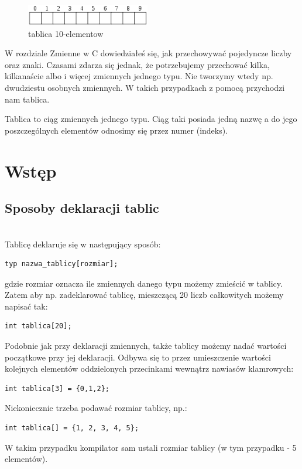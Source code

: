 \documentclass[a4paper,12pt]{article}
\begin{document}
\begin{figure}
\begin{center}
\includegraphics[width=0.48\textwidth]{pic1.png}
\end{center}
\caption{tablica 10-elementow}
\label{Etykieta}
\end{figure}

W rozdziale Zmienne w C dowiedziałeś się, jak przechowywać pojedyncze liczby oraz znaki. Czasami zdarza się jednak, że potrzebujemy przechować kilka, kilkanaście albo i więcej zmiennych jednego typu. Nie tworzymy wtedy np. dwudziestu osobnych zmiennych. W takich przypadkach z pomocą przychodzi nam tablica.



Tablica to ciąg zmiennych jednego typu. Ciąg taki posiada jedną nazwę a do jego poszczególnych elementów odnosimy się przez numer (indeks).

\section*{Wstęp}

\subsection*{Sposoby deklaracji tablic}\\

Tablicę deklaruje się w następujący sposób:
\begin{lstlisting}[caption=Deklaracja, captionpos=t, label=src:sqrt, frame=lBTr, frameround=ffff, captionpos=b]
typ nazwa_tablicy[rozmiar];
\end{lstlisting}
gdzie rozmiar oznacza ile zmiennych danego typu możemy zmieścić w tablicy. Zatem aby np. zadeklarować tablicę, mieszczącą 20 liczb całkowitych możemy napisać tak:
\begin{lstlisting}[caption=Deklaracja tablicy 20 int, captionpos=t, label=src:sqrt, frame=lBTr, frameround=ffff, captionpos=b]
int tablica[20];
\end{lstlisting}
Podobnie jak przy deklaracji zmiennych, także tablicy możemy nadać wartości początkowe przy jej deklaracji. Odbywa się to przez umieszczenie wartości kolejnych elementów oddzielonych przecinkami wewnątrz nawiasów klamrowych:
\begin{lstlisting}[caption=Inicjalizacja, captionpos=t, label=src:sqrt, frame=lBTr, frameround=ffff, captionpos=b ]
 int tablica[3] = {0,1,2};
\end{lstlisting}
Niekoniecznie trzeba podawać rozmiar tablicy, np.:
\begin{lstlisting}[caption=Inicjalizacja bez rozmiaru, captionpos=t, label=src:sqrt, frame=lBTr, frameround=ffff, captionpos=b ]
 int tablica[] = {1, 2, 3, 4, 5};
\end{lstlisting}
W takim przypadku kompilator sam ustali rozmiar tablicy (w tym przypadku - 5 elementów).
\end{document}
